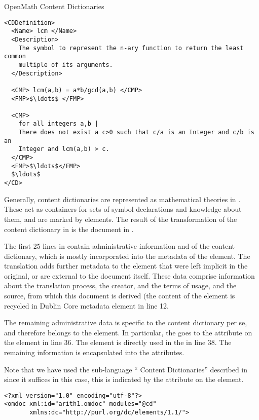 \begin{tchapter}[id=omcds]{OpenMath Content Dictionaries}
\begin{lstlisting}[language=omCD,label=lst:omcd,mathescape,
    caption={Part of the {\openmath} content dictionary {\snippet{arith1.ocd}}}]
  <CDDefinition>
  <Name> lcm </Name>
  <Description> 
    The symbol to represent the n-ary function to return the least common
    multiple of its arguments.
  </Description>

  <CMP> lcm(a,b) = a*b/gcd(a,b) </CMP>
  <FMP>$\ldots$ </FMP>

  <CMP>
    for all integers a,b |
    There does not exist a c>0 such that c/a is an Integer and c/b is an
    Integer and lcm(a,b) > c.
  </CMP>
  <FMP>$\ldots$</FMP>
  $\ldots$
</CD>
\end{lstlisting}

\noindent Generally, {\openmath} content dictionaries are
represented as mathematical theories in {\omdoc}. These act as
containers for sets of symbol declarations and knowledge about them,
and are marked by {} elements. The result of the
transformation of the content dictionary in {} is the
{\omdoc} document in {}.

The first 25 lines in {} contain administrative information and
{} of the content dictionary, which is mostly incorporated into
the metadata of the {} element. The translation adds further
metadata to the {} element that were left implicit in the original,
or are external to the document itself. These data comprise information about the
translation process, the creator, and the terms of usage, and the source, from
which this document is derived (the content of the {} element is
recycled in Dublin Core metadata element {} in line 12.

The remaining administrative data is specific to the content dictionary per se, and
therefore belongs to the {} element. In particular, the
{} goes to the {} attribute on the
{} element in line 36. The {} element is
directly used in the {} in line 38.  The remaining information is
encapsulated into the {} attributes.

Note that we have used the {\omdoc} sub-language ``{\omdoc} Content Dictionaries''
described in {} since it suffices in this case, this is
indicated by the {} attribute on the {} element.

\begin{lstlisting}[label=lst:omdoccd,escapechar=\|,mathescape,
    caption={The {\openmath} content dictionary {\snippet{arith1}} in {\omdoc} form},
    index={DOCTYPE,omdoc,metadata,dc:title,dc:creator,dc:date,dc:description,dc:source,dc:type,dc:format,theory
           omtext,CMP}]
<?xml version="1.0" encoding="utf-8"?>
<omdoc xml:id="arith1.omdoc" modules="@cd"
       xmlns:dc="http://purl.org/dc/elements/1.1/">


\end{lstlisting}
\end{tchapter}
